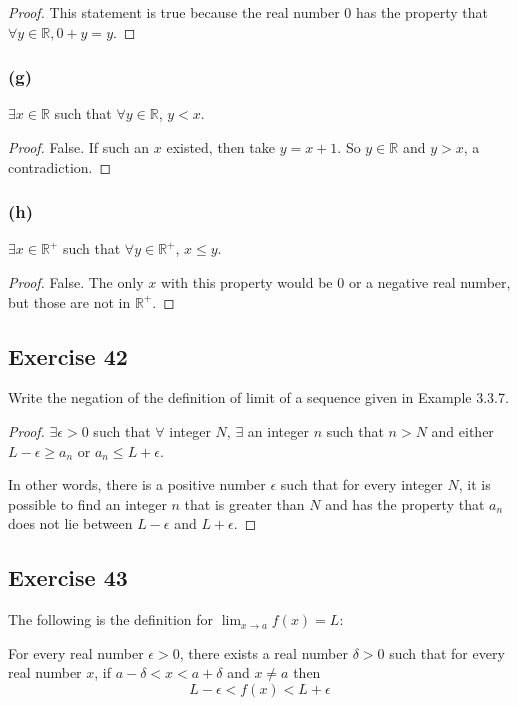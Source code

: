 \documentclass[14pt]{extarticle}
\newcommand{\R}{\mathbb{R}}
\newcommand{\fa}{\forall}
\newcommand{\te}{\exists}
\begin{document}
\begin{proof}
    This statement is true because the real number 0 has the property that $\fa y \in \R, 0 + y = y$.
\end{proof}

\subsubsection{(g)}
$\te x \in \R$ such that $\fa y \in \R$, $y < x$.

\begin{proof}
    False. If such an $x$ existed, then take $y = x+1$. So $y \in \R$ and $y > x$, a contradiction.
\end{proof}

\subsubsection{(h)}
$\te x \in \R^+$ such that $\fa y \in \R^+$, $x \leq y$.

\begin{proof}
    False. The only $x$ with this property would be 0 or a negative real number, but those are not in $\R^+$.
\end{proof}

\subsection{Exercise 42}
Write the negation of the definition of limit of a sequence given in Example 3.3.7.

\begin{proof}
    $\te \epsilon > 0$ such that $\fa$ integer $N$, $\te$ an integer $n$ such that $n > N$ and either $L - \epsilon \geq a_n$ or $a_n \leq L + \epsilon$.

    In other words, there is a positive number $\epsilon$ such that for every integer $N$, it is possible to find an integer $n$ that is greater than $N$ and has the property that $a_n$ does not lie between $L - \epsilon$ and $L + \epsilon$.
\end{proof}

\subsection{Exercise 43}
The following is the definition for $\lim_{x \to a} f(x) = L$:

For every real number $\epsilon > 0$, there exists a real number $\delta > 0$ such that for every real number $x$, if $a - \delta < x < a + \delta$ and $x \neq a$ then
$$
    L - \epsilon < f(x) < L + \epsilon
$$
\end{document}
